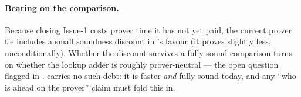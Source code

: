 \paragraph{Bearing on the comparison.} Because closing Issue-1 costs
\zinc{} prover time it has not yet paid, the current prover tie includes a
small soundness discount in \zinc{}'s favour (it proves slightly less,
unconditionally). Whether the discount survives a fully sound comparison
turns on whether the lookup adder is roughly prover-neutral --- the open
question flagged in . \binius{} carries no such debt:
it is faster \emph{and} fully sound today, and any ``who is ahead on the
prover'' claim must fold this in.
